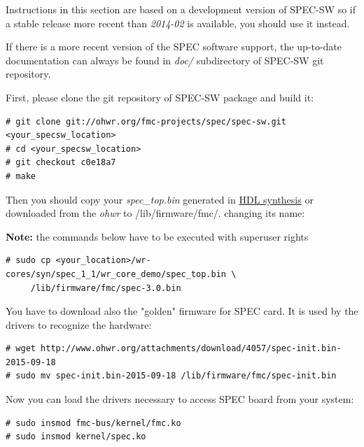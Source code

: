 \documentclass[a4paper, 12pt]{article}
\newcommand{\link}[1]{\hyperref[#1]{#1}}
\newcommand{\codeHook}[1]{\mbox{\ttfamily\MakeTextUppercase{#1}}}
\begin{document}
Instructions in this section are based on a development version of \codeHook{spec-sw}
so if a stable release more recent than \textit{2014-02} is available, you should
use it instead. 

If there is a more recent version of the \codeHook{spec} software support, the
up-to-date documentation can always be found in \textit{doc/} subdirectory of
\codeHook{spec-sw} git repository.

\vspace{1em}
First, please clone the git repository of \codeHook{spec-sw} package and build it:

\begin{lstlisting}
# git clone git://ohwr.org/fmc-projects/spec/spec-sw.git <your_specsw_location>
# cd <your_specsw_location>
# git checkout c0e18a7
# make
\end{lstlisting}

Then you should copy your \textit{spec\_top.bin} generated in \link{HDL synthesis} or
downloaded from the \textit{ohwr} to /lib/firmware/fmc/. changing its
name:

\textbf{Note:} the commands below have to be executed with superuser rights

\begin{lstlisting}
# sudo cp <your_location>/wr-cores/syn/spec_1_1/wr_core_demo/spec_top.bin \
     /lib/firmware/fmc/spec-3.0.bin
\end{lstlisting}

You have to download also the "golden" firmware for \codeHook{spec} card. It is used by
the drivers to recognize the hardware:

\begin{lstlisting}
# wget http://www.ohwr.org/attachments/download/4057/spec-init.bin-2015-09-18
# sudo mv spec-init.bin-2015-09-18 /lib/firmware/fmc/spec-init.bin
\end{lstlisting}

Now you can load the drivers necessary to access \codeHook{spec} board from your
system:
\begin{lstlisting}
# sudo insmod fmc-bus/kernel/fmc.ko
# sudo insmod kernel/spec.ko
\end{lstlisting}
\end{document}
